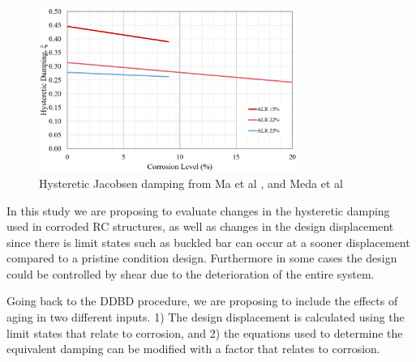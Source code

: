 \begin{figure}[htbp]
	\centering
    \includegraphics[width=0.75\textwidth]{VAC Prelim 2.0/Chapter-5/figs/HystereticDampingLitResults.png}
	\caption{Hysteretic Jacobsen damping from Ma et al \cite{Ma2012}, and Meda et al \cite{Meda2014}}
	\label{fig:DDBD_sum}
\end{figure}

In this study we are proposing to evaluate changes in the hysteretic damping used in corroded RC structures, as well as changes in the design displacement since there is limit states such as buckled bar can occur at a sooner displacement compared to a pristine condition design. Furthermore in some cases the design could be controlled by shear due to the deterioration of the entire system.

Going back to the DDBD procedure, we are proposing to include the effects of aging in two different inputs. 1) The design displacement is calculated using the limit states that relate to corrosion, and 2) the equations used to determine the equivalent damping can be modified with a factor that relates to corrosion.

